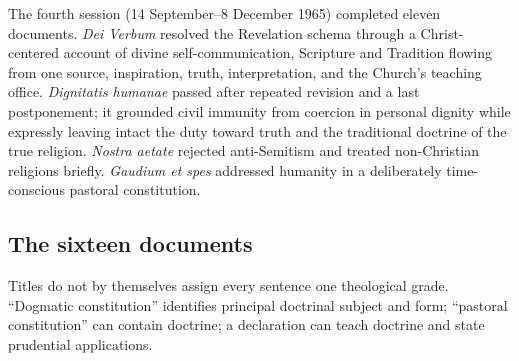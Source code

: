 The fourth session (14 September--8 December 1965) completed eleven documents. \emph{Dei Verbum} resolved the Revelation schema through a Christ-centered account of divine self-communication, Scripture and Tradition flowing from one source, inspiration, truth, interpretation, and the Church's teaching office. \emph{Dignitatis humanae} passed after repeated revision and a last postponement; it grounded civil immunity from coercion in personal dignity while expressly leaving intact the duty toward truth and the traditional doctrine of the true religion. \emph{Nostra aetate} rejected anti-Semitism and treated non-Christian religions briefly. \emph{Gaudium et spes} addressed humanity in a deliberately time-conscious pastoral constitution.

\subsection{The sixteen documents}

Titles do not by themselves assign every sentence one theological grade. “Dogmatic constitution” identifies principal doctrinal subject and form; “pastoral constitution” can contain doctrine; a declaration can teach doctrine and state prudential applications.

